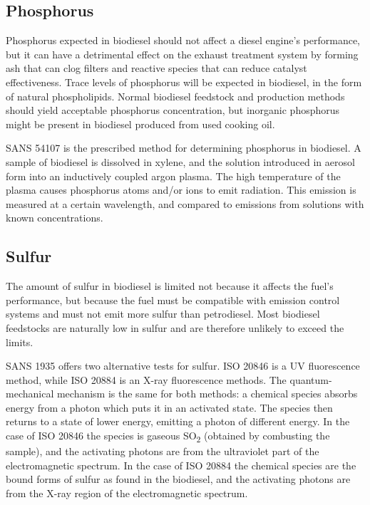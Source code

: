\subsection{Phosphorus}

Phosphorus expected in biodiesel should not affect a diesel engine's
performance, but it can have a detrimental effect on the exhaust treatment
system by forming ash that can clog filters and reactive species that can reduce
catalyst effectiveness. Trace levels of phosphorus will be expected in
biodiesel, in the form of natural phospholipids. Normal biodiesel feedstock and
production methods should yield acceptable phosphorus concentration, but
inorganic phosphorus might be present in biodiesel produced from used cooking
oil.
 
SANS 54107 is the prescribed method for determining phosphorus in biodiesel. A
sample of biodiesel is dissolved in xylene, and the solution introduced in
aerosol form into an inductively coupled argon plasma. The high temperature of
the plasma causes phosphorus atoms and/or ions to emit radiation. This emission
is measured at a certain wavelength, and compared to emissions from solutions
with known concentrations.

\subsection{Sulfur}

The amount of sulfur in biodiesel is limited not because it affects the fuel's
performance, but because the fuel must be compatible with emission control
systems and must not emit more sulfur than petrodiesel. Most biodiesel
feedstocks are naturally low in sulfur and are therefore unlikely to exceed the
limits.

SANS 1935 offers two alternative tests for sulfur. ISO 20846 is a UV
fluorescence method, while ISO 20884 is an X-ray fluorescence methods. The
quantum-mechanical mechanism is the same for both methods: a chemical species
absorbs energy from a photon which puts it in an activated state. The species
then returns to a state of lower energy, emitting a photon of different energy.
In the case of ISO 20846 the species is gaseous SO\textsubscript{2} (obtained by
combusting the sample), and the activating photons are from the ultraviolet part
of the electromagnetic spectrum. In the case of ISO 20884 the chemical species
are the bound forms of sulfur as found in the biodiesel, and the activating
photons are from the X-ray region of the electromagnetic spectrum.

